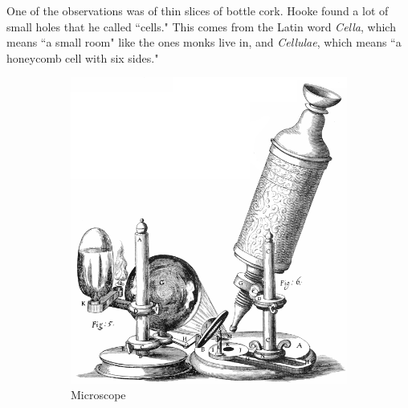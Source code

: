\documentclass[12pt, a4paper, titlepage]{article}
\begin{document}
One of the observations was of thin slices of bottle cork. Hooke found a lot of small holes that he called ``cells." This comes from the Latin word \textit{Cella}, which means ``a small room" like the ones monks live in, and \textit{Cellulae}, which means ``a honeycomb cell with six sides."

\begin{figure}[H]
    \centering
    \caption{Robert Hooke's drawings from \textit{Micrographia}}
    \begin{subfigure}{0.45\textwidth}
        \centering
        \includegraphics[scale=0.25]{img/hooke-scope.png}
        \caption{Microscope}
    \end{subfigure}
    \begin{subfigure}{0.45\textwidth}
        \centering

\end{subfigure}
\end{figure}
\end{document}
